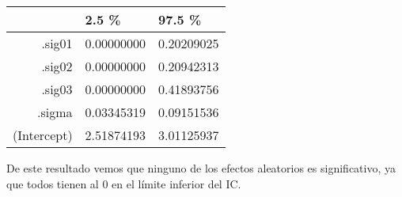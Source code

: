\documentclass[11pt]{article}
\begin{document}
    \begin{tabular}{r|ll}
  & 2.5 \% & 97.5 \%\\
\hline
	.sig01 & 0.00000000 & 0.20209025\\
	.sig02 & 0.00000000 & 0.20942313\\
	.sig03 & 0.00000000 & 0.41893756\\
	.sigma & 0.03345319 & 0.09151536\\
	(Intercept) & 2.51874193 & 3.01125937\\
\end{tabular}


    
    De este resultado vemos que ninguno de los efectos aleatorios es
significativo, ya que todos tienen al 0 en el límite inferior del IC.


    
    
    
    
\end{document}
